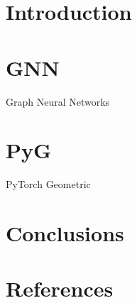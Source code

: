 \section[Intro]{Introduction}


\section{GNN}{Graph Neural Networks}


\section{PyG}{PyTorch Geometric}




\section[Conclusions]{Conclusions}


\section[Refs]{References}
